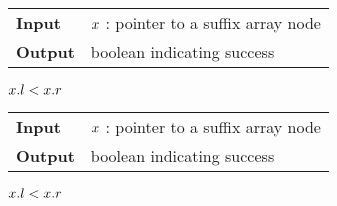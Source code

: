 \begin{figure*}
\begin{minipage}[t]{.5\textwidth}
\begin{algorithm}[H]
\begin{tabular}{ll}
\textbf{Input}  & $x$ : pointer to a suffix array node\\
\textbf{Output} & boolean indicating success\\
\end{tabular}
\begin{algorithmic}[1]
	\State \Return \False
\EndIf
{}
{}
\EndIf
\State \Return $x.l < x.r$
\end{algorithmic}
\label{alg:sa-godown}
\end{algorithm}
\end{minipage}
\hfill
\begin{minipage}[t]{.5\textwidth}
\begin{algorithm}[H]
\begin{tabular}{ll}
\textbf{Input}  & $x$ : pointer to a suffix array node\\
\textbf{Output} & boolean indicating success\\
\end{tabular}
\begin{algorithmic}[1]
	\State \Return \False
\EndIf
{}
\EndIf
\State \Return $x.l < x.r$
\end{algorithmic}
\label{alg:sa-goright}
\end{algorithm}
\end{minipage}
\end{figure*}

